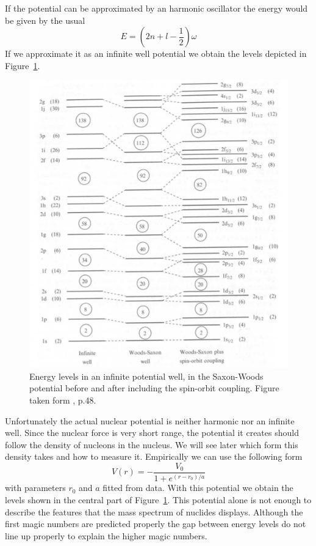 \documentclass[12pt]{article}
\begin{document}
If the potential can be approximated by an harmonic oscillator the energy would be given by the usual
\[E=\left(2n+l-\frac{1}{2}\right)\omega\] 
If we approximate it as an infinite well potential we obtain the levels depicted in Figure~\ref{fig:levels}.

\begin{figure}
\begin{center}
\includegraphics[scale=0.5]{images/harmonicSWplusSpinCoupling.png}
\caption{Energy levels in an infinite potential well, in the Saxon-Woods potential before and after including the spin-orbit coupling. Figure taken form \cite{Lilley:2009zz}, p.48.}\label{fig:levels}
\end{center}
\end{figure}

Unfortunately the actual nuclear potential is neither harmonic nor an infinite well. Since the nuclear force is very short range, the potential it creates should follow the density of nucleons in the nucleus. We will see later which form this density takes and how to measure it. Empirically we can use the following form 
\[V(r)=-\frac{V_0}{1+e^{(r-r_0)/a}}\]
with parameters $r_0$ and $a$ fitted from data. With this potential we obtain the levels shown in the central part of Figure~\ref{fig:levels}. This potential alone is not enough to describe the features that the mass spectrum of nuclides displays. Although the first magic numbers are predicted properly the gap between energy levels do not line up properly to explain the higher magic numbers.
\end{document}
